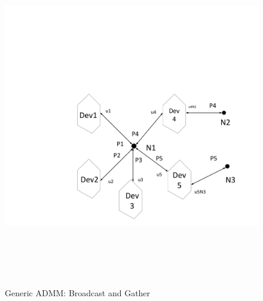 \documentclass[preprint,12pt,3p]{elsarticle}
\begin{document}
\begin{figure}
\begin{center}
\vspace*{-2cm}
\hspace*{-4cm}
\includegraphics[height=15cm,width=20cm]{Prox.pdf}
\caption{Generic ADMM: Broadcast and Gather}
\label{ADMMGen}
\end{center}
\end{figure}
\end{document}
